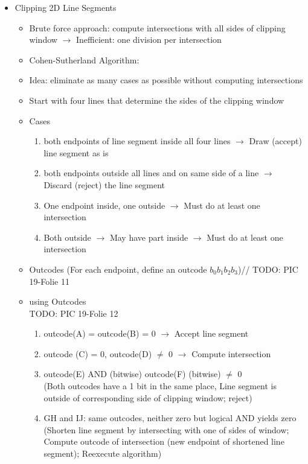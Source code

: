 \documentclass[11pt,a4paper]{article}
\begin{document}
\begin{itemize}
\begin{itemize}
				\end{itemize}
			\item Clipping 2D Line Segments
				\begin{itemize}
					\item Brute force approach: compute intersections with all sides of clipping window
					$\rightarrow$ Inefficient: one division per intersection
					\item Cohen-Sutherland Algorithm:
					\item Idea: eliminate as many cases as possible without computing intersections
					\item Start with four lines that determine the sides of the clipping window
					\item Cases
						\begin{enumerate}
							\item both endpoints of line segment inside all four lines $\rightarrow$ Draw (accept) line segment as is
							\item both endpoints outside all lines and on same side of a line $\rightarrow$ Discard (reject) the line segment
							\item One endpoint inside, one outside $\rightarrow$ Must do at least one intersection
							\item Both outside $\rightarrow$ May have part inside $\rightarrow$ Must do at least one intersection
						\end{enumerate}
					\item Outcodes (For each endpoint, define an outcode $b_0b_1b_2b_3$)//
					TODO: PIC 19-Folie 11
					\item using Outcodes\\
					TODO: PIC 19-Folie 12
						\begin{enumerate}
							\item outcode(A) = outcode(B) = 0 $\rightarrow$ Accept line segment
							\item outcode (C) = 0, outcode(D) $\ne$ 0 $\rightarrow$ Compute intersection
							\item outcode(E) AND (bitwise) outcode(F) (bitwise) $\ne$ 0\\
							(Both outcodes have a 1 bit in the same place, Line segment is outside of corresponding side of clipping window; reject)
							\item GH and IJ: same outcodes, neither zero but logical AND yields zero\\
							(Shorten line segment by intersecting with one of sides of window; Compute outcode of intersection (new endpoint of shortened line segment); Reexecute algorithm)

\end{enumerate}
\end{itemize}
\end{itemize}
\end{document}

